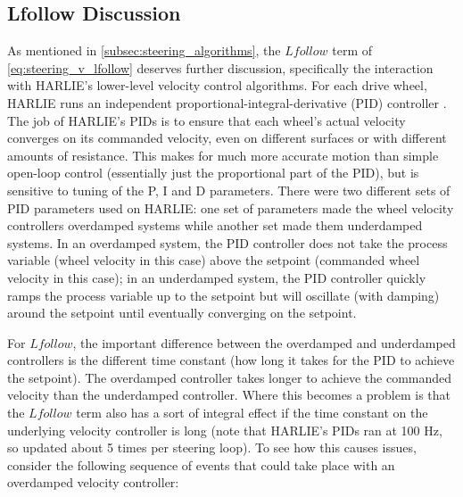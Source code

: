 \subsection{Lfollow Discussion}\label{subsec:lfollow_discussion_steering}

As mentioned in \autoref{subsec:steering_algorithms}, the $Lfollow$ term of \eqref{eq:steering_v_lfollow} deserves further discussion, specifically the interaction with HARLIE's lower-level velocity control algorithms. For each drive wheel, HARLIE runs an independent proportional-integral-derivative (PID) controller \autocite{PIDControllerWiki}. The job of HARLIE's PIDs is to ensure that each wheel's actual velocity converges on its commanded velocity, even on different surfaces or with different amounts of resistance. This makes for much more accurate motion than simple open-loop control (essentially just the proportional part of the PID), but is sensitive to tuning of the P, I and D parameters. There were two different sets of PID parameters used on HARLIE: one set of parameters made the wheel velocity controllers overdamped systems while another set made them underdamped systems. In an overdamped system, the PID controller does not take the process variable (wheel velocity in this case) above the setpoint (commanded wheel velocity in this case); in an underdamped system, the PID controller quickly ramps the process variable up to the setpoint but will oscillate (with damping) around the setpoint until eventually converging on the setpoint.

For $Lfollow$, the important difference between the overdamped and underdamped controllers is the different time constant (how long it takes for the PID to achieve the setpoint). The overdamped controller takes longer to achieve the commanded velocity than the underdamped controller. Where this becomes a problem is that the $Lfollow$ term also has a sort of integral effect if the time constant on the underlying velocity controller is long (note that HARLIE's PIDs ran at 100 Hz, so updated about 5 times per steering loop). To see how this causes issues, consider the following sequence of events that could take place with an overdamped velocity controller:

